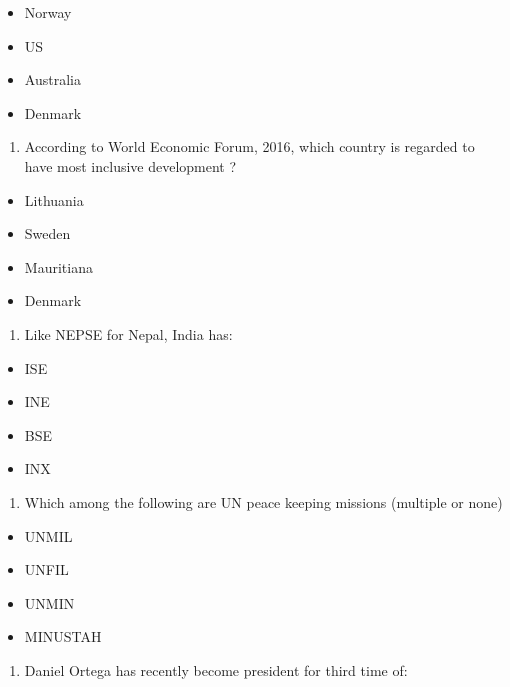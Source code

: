 \documentclass[]{book}
\providecommand{\tightlist}{%
  \setlength{\itemsep}{0pt}\setlength{\parskip}{0pt}}
\begin{document}
\begin{itemize}
\tightlist
\item
  Norway
\item
  US
\item
  Australia
\item
  Denmark
\end{itemize}

\begin{enumerate}
\def\labelenumi{\arabic{enumi}.}
\setcounter{enumi}{3}
\tightlist
\item
  According to World Economic Forum, 2016, which country is regarded to have most inclusive development ?
\end{enumerate}

\begin{itemize}
\tightlist
\item
  Lithuania
\item
  Sweden
\item
  Mauritiana
\item
  Denmark
\end{itemize}

\begin{enumerate}
\def\labelenumi{\arabic{enumi}.}
\setcounter{enumi}{4}
\tightlist
\item
  Like NEPSE for Nepal, India has:
\end{enumerate}

\begin{itemize}
\tightlist
\item
  ISE
\item
  INE
\item
  BSE
\item
  INX
\end{itemize}

\begin{enumerate}
\def\labelenumi{\arabic{enumi}.}
\setcounter{enumi}{5}
\tightlist
\item
  Which among the following are UN peace keeping missions (multiple or none)
\end{enumerate}

\begin{itemize}
\tightlist
\item
  UNMIL
\item
  UNFIL
\item
  UNMIN
\item
  MINUSTAH
\end{itemize}

\begin{enumerate}
\def\labelenumi{\arabic{enumi}.}
\setcounter{enumi}{6}
\tightlist
\item
  Daniel Ortega has recently become president for third time of:
\end{enumerate}
\end{document}
